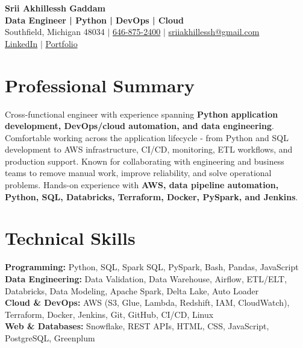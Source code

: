 \documentclass[letterpaper,10pt]{article}
\begin{document}
\fontsize{9.35pt}{10.45pt}\selectfont

\begin{center}
    {\LARGE \textbf{Srii Akhillessh Gaddam}} \\[-1pt]
    \textbf{Data Engineer | Python | DevOps | Cloud} \\[2pt]
    Southfield, Michigan 48034 $|$
    \href{tel:6468752400}{646-875-2400} $|$
    \href{mailto:sriiakhillessh@gmail.com}{sriiakhillessh@gmail.com} \\[1pt]
    \href{https://www.linkedin.com/in/srii-akhiilessh-gaddam-b48668191/}{LinkedIn} $|$
    \href{https://sriiakhillesshg.github.io/portfolio/}{Portfolio}
\end{center}
\vspace{-8pt}

\section{Professional Summary}
\small{Cross-functional engineer with experience spanning \textbf{Python application development, DevOps/cloud automation, and data engineering}. Comfortable working across the application lifecycle - from Python and SQL development to AWS infrastructure, CI/CD, monitoring, ETL workflows, and production support. Known for collaborating with engineering and business teams to remove manual work, improve reliability, and solve operational problems. Hands-on experience with \textbf{AWS, data pipeline automation, Python, SQL, Databricks, Terraform, Docker, PySpark, and Jenkins}.}

\section{Technical Skills}
\small{
\textbf{Programming:} Python, SQL, Spark SQL, PySpark, Bash, Pandas, JavaScript \\
\textbf{Data Engineering:} Data Validation, Data Warehouse, Airflow, ETL/ELT, Databricks, Data Modeling, Apache Spark, Delta Lake, Auto Loader \\
\textbf{Cloud \& DevOps:} AWS (S3, Glue, Lambda, Redshift, IAM, CloudWatch), Terraform, Docker, Jenkins, Git, GitHub, CI/CD, Linux \\
\textbf{Web \& Databases:} Snowflake, REST APIs, HTML, CSS, JavaScript, PostgreSQL, Greenplum
}
\end{document}
